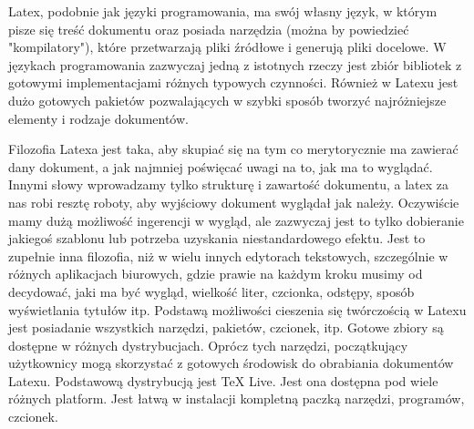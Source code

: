 Latex, podobnie jak języki programowania, ma swój własny język, w którym pisze się treść dokumentu oraz posiada narzędzia (można by powiedzieć "kompilatory"), które przetwarzają pliki źródłowe i generują pliki docelowe. W językach programowania zazwyczaj jedną z istotnych rzeczy jest zbiór bibliotek z gotowymi implementacjami różnych typowych czynności. Również w Latexu jest dużo gotowych pakietów pozwalających w szybki sposób tworzyć najróżniejsze elementy i rodzaje dokumentów.\newline

Filozofia Latexa jest taka, aby skupiać się na tym co merytorycznie ma zawierać dany dokument, a jak najmniej poświęcać uwagi na to, jak ma to wyglądać. Innymi słowy wprowadzamy tylko strukturę i zawartość dokumentu, a latex za nas robi resztę roboty, aby wyjściowy dokument wyglądał jak należy. Oczywiście mamy dużą możliwość ingerencji w wygląd, ale zazwyczaj jest to tylko dobieranie jakiegoś szablonu lub potrzeba uzyskania niestandardowego efektu. Jest to zupełnie inna filozofia, niż w wielu innych edytorach tekstowych, szczególnie w różnych aplikacjach biurowych, gdzie prawie na każdym kroku musimy od decydować, jaki ma być wygląd, wielkość liter, czcionka, odstępy, sposób wyświetlania tytułów itp.\newline 
Podstawą możliwości cieszenia się twórczością w Latexu jest posiadanie wszystkich narzędzi, pakietów, czcionek, itp. Gotowe zbiory są dostępne w różnych dystrybucjach. Oprócz tych narzędzi, początkujący użytkownicy mogą skorzystać z gotowych środowisk do obrabiania dokumentów Latexu.\newline
Podstawową dystrybucją jest TeX Live. Jest ona dostępna pod wiele różnych platform. Jest łatwą w instalacji kompletną paczką narzędzi, programów, czcionek.

\newpage


